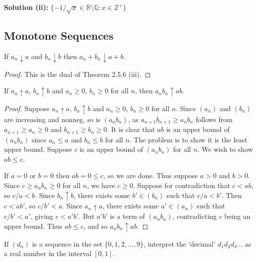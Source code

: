 \textbf{Solution (ii):} $\{-1/\sqrt{x} \in \mathbb{R} \setminus \mathbb{Q}: x \in \mathbb{Z^+}\}$

\subsection{Monotone Sequences} 

\begin{tcolorbox}[title=Problem 1, breakable]
    If $a_n \downarrow a$ and $b_n \downarrow b$
    then $a_n + b_n \downarrow a + b$.
\end{tcolorbox}

\begin{proof}
    This is the dual of Theorem 2.5.6 (iii).
\end{proof}

\begin{tcolorbox}[title=Problem 2, breakable]
    If $a_n \uparrow a$, $b_n \uparrow b$ and $a_n \ge 0$, $b_n \ge 0$ for all $n$,
        then $a_n b_n \uparrow ab$.
\end{tcolorbox}

\begin{proof}
    Suppose $a_n \uparrow a$, $b_n \uparrow b$ and $a_n \ge 0$, $b_n \ge 0$
    for all $n$. Since $(a_n)$ and $(b_n)$ are increasing and nonneg, so is
    $(a_n b_n)$, as $a_{n+1}b_{n+1} \ge a_n b_n$ follows from
    $a_{n+1} \ge a_n \ge 0$ and $b_{n+1} \ge b_n \ge 0$.
    It is clear that $ab$ is an upper bound of $(a_n b_n)$ since
    $a_n \le a$ and $b_n \le b$ for all $n$.
    The problem is to show it is the least upper bound.
    Suppose $c$ is an upper bound of $(a_n b_n)$ for all $n$.
    We wish to show $ab \le c$.

    If $a = 0$ or $b = 0$ then $ab = 0 \le c$, so we are done.
    Thus suppose $a > 0$ and $b > 0$.
    Since $c \ge a_n b_n \ge 0$ for all $n$, we have $c \ge 0$.
    Suppose for contradiction that $c < ab$, so $c/a < b$.
    Since $b_n \uparrow b$, there exists some $b' \in (b_n)$ such that
    $c/a < b'$.
    Then $c < a b'$, so $c/b' < a$.
    Since $a_n \uparrow a$, there exists some $a' \in (a_n)$ such that
    $c/b' < a'$, giving $c < a'b'$.
    But $a'b'$ is a term of $(a_n b_n)$, contradicting $c$ being an upper
    bound. Thus $ab \le c$, and so $a_n b_n \uparrow ab$.
\end{proof}

\begin{tcolorbox}[title=Problem 3, breakable]
    If $(d_n)$ is a sequence in the set
        $\{0,1,2,\ldots,9\}$, interpret the `decimal'
        $d_1 d_2 d_3\ldots$ as a real number in the interval $[0, 1]$.
\end{tcolorbox}

